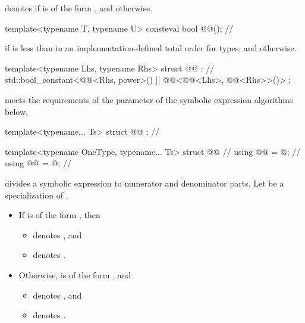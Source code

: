 \pnum
{} denotes
 if  is of the form , and
 otherwise.

\begin{itemdecl}
template<typename T, typename U>
consteval bool @@();  // \expos
\end{itemdecl}

\begin{itemdescr}
\pnum
\returns
{} if  is less than 
in an implementation-defined total order for types, and
 otherwise.
\end{itemdescr}

\begin{codeblock}
template<typename Lhs, typename Rhs>
struct @@ :  // \expos
    std::bool_constant<@@<Rhs, power>() ||
                       @@<@@<Lhs>, @@<Rhs>>()> {};
\end{codeblock}

\pnum
{} meets the requirements of
the  parameter of the symbolic expression algorithms below.

\begin{codeblock}
template<typename... Ts>
struct @@ {};      // \expos

template<typename OneType, typename... Ts>
struct @@ {   // \expos
  using @@ = @\seebelownc@;  // \expos
  using @@ = @\seebelownc@;  // \expos
}
\end{codeblock}

\pnum
{} divides a symbolic expression to numerator and denominator parts.
Let  be a specialization of .
\begin{itemize}
\item
If  is of the form ,
then
\begin{itemize}
\item
{} denotes , and
\item
{} denotes .
\end{itemize}
\item
Otherwise,  is of the form , and
\begin{itemize}
\item
{} denotes , and
\item
{} denotes .
\end{itemize}
\end{itemize}

